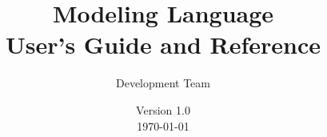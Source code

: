 \title{\Huge\bf \Stan Modeling Language \\[4pt] {\LARGE User's Guide and Reference}}
\author{\Stan Development Team}
\date{\vspace*{36pt} \Stan Version 1.0 \\[4pt] {\small \today}} %

\maketitle
